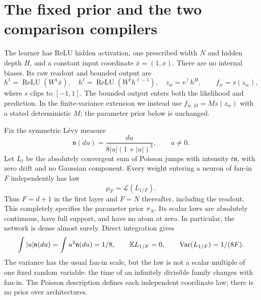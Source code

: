 \section{The fixed prior and the two comparison compilers}
\label{sec:levy-model-compilers}
The learner has ReLU hidden activation, one prescribed width $N$ and hidden depth $H$, and a constant input coordinate $\bar x=(1,x)$. There are no internal biases. Its raw readout and bounded output are
\[
 h^1=\operatorname{ReLU}(W^1\bar x),\quad
 h^\ell=\operatorname{ReLU}(W^\ell h^{\ell-1}),\quad
 z_w=v^\top h^H,\qquad f_w=s(z_w),
\]
where $s$ clips to $[-1,1]$. The bounded output enters both the likelihood and prediction. In the finite-variance extension we instead use $f_{w,M}=M s(z_w)$ with a stated deterministic $M$; the parameter prior below is unchanged.

Fix the symmetric L\'evy measure
\begin{equation}
 \mathfrak n(du)=\frac{du}{8|u|(1+|u|)^3},\qquad u\ne0.
 \label{eq:prior-Levy-measure}
\end{equation}
Let $L_t$ be the absolutely convergent sum of Poisson jumps with intensity $t\mathfrak n$, with zero drift and no Gaussian component. Every weight entering a neuron of fan-in $F$ independently has law
\begin{equation}
 \mu_F=\mathcal L(L_{1/F}).
 \label{eq:fanin-prior}
\end{equation}
Thus $F=d+1$ in the first layer and $F=N$ thereafter, including the readout. This completely specifies the parameter prior $\pi_N$. Its scalar laws are absolutely continuous, have full support, and have no atom at zero. In particular, the network is dense almost surely. Direct integration gives
\[
 \int |u|\mathfrak n(du)=\int u^2\mathfrak n(du)=1/8,
 \qquad \mathbb E L_{1/F}=0,\qquad
 \operatorname{Var}(L_{1/F})=1/(8F).
\]
The variance has the usual fan-in scale, but the law is not a scalar multiple of one fixed random variable: the time of an infinitely divisible family changes with fan-in. The Poisson description defines each independent coordinate law; there is no prior over architectures.

